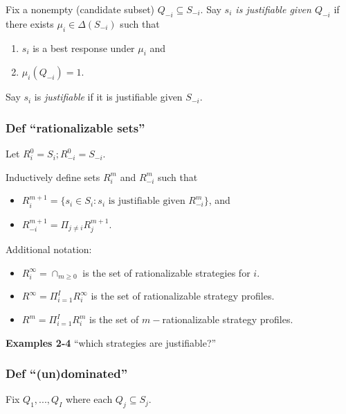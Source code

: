 \documentclass[
]{article}
\providecommand{\tightlist}{%
  \setlength{\itemsep}{0pt}\setlength{\parskip}{0pt}}
\begin{document}
Fix a nonempty (candidate subset) \(Q_{-i} \subseteq S_{-i}\). Say
\emph{\(s_i\) is justifiable given \(Q_{-i}\)} if there exists
\(\mu_i \in \Delta(S_{-i})\) such that

\begin{enumerate}
\def\labelenumi{\arabic{enumi}.}
\tightlist
\item
  \(s_i\) is a best response under \(\mu_i\) and
\item
  \(\mu_i(Q_{-i})=1\).
\end{enumerate}

Say \(s_i\) is \emph{justifiable} if it is justifiable given \(S_{-i}\).

\hypertarget{def-rationalizable-sets}{%
\subsubsection{Def ``rationalizable
sets''}\label{def-rationalizable-sets}}

Let \(R_i^0 = S_i; R_{-i}^0 = S_{-i}.\)

Inductively define sets \(R_i^m\) and \(R_{-i}^m\) such that

\begin{itemize}
\tightlist
\item
  \(R_i^{m+1} = \{s_i \in S_i: s_i \text{ is justifiable given } R_{-i}^m\}\),
  and
\item
  \(R_{-i}^{m+1} = \Pi_{j \neq i}R_{j}^{m+1}\).
\end{itemize}

Additional notation:

\begin{itemize}
\tightlist
\item
  \(R_i^\infty = \cap_{m\geq 0}\) is the set of rationalizable
  strategies for \(i\).
\item
  \(R^\infty = \Pi_{i=1}^I R_i^\infty\) is the set of rationalizable
  strategy profiles.
\item
  \(R^m = \Pi_{i=1}^I R_i^m\) is the set of \(m-\)rationalizable
  strategy profiles.
\end{itemize}

\textbf{Examples 2-4} ``which strategies are justifiable?''

\hypertarget{def-undominated}{%
\subsubsection{Def ``(un)dominated''}\label{def-undominated}}

Fix \(Q_1, ..., Q_I\) where each \(Q_j \subseteq S_j\).
\end{document}
